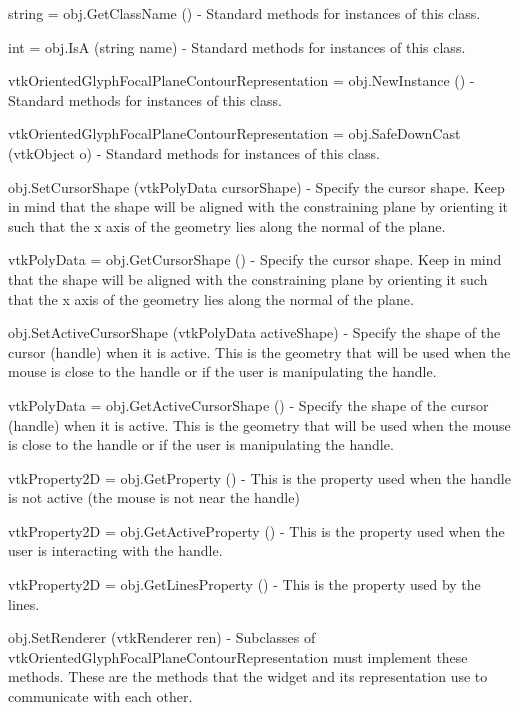 \begin{DoxyItemize}
\item {\ttfamily string = obj.\-Get\-Class\-Name ()} -\/ Standard methods for instances of this class.  
\item {\ttfamily int = obj.\-Is\-A (string name)} -\/ Standard methods for instances of this class.  
\item {\ttfamily vtk\-Oriented\-Glyph\-Focal\-Plane\-Contour\-Representation = obj.\-New\-Instance ()} -\/ Standard methods for instances of this class.  
\item {\ttfamily vtk\-Oriented\-Glyph\-Focal\-Plane\-Contour\-Representation = obj.\-Safe\-Down\-Cast (vtk\-Object o)} -\/ Standard methods for instances of this class.  
\item {\ttfamily obj.\-Set\-Cursor\-Shape (vtk\-Poly\-Data cursor\-Shape)} -\/ Specify the cursor shape. Keep in mind that the shape will be aligned with the constraining plane by orienting it such that the x axis of the geometry lies along the normal of the plane.  
\item {\ttfamily vtk\-Poly\-Data = obj.\-Get\-Cursor\-Shape ()} -\/ Specify the cursor shape. Keep in mind that the shape will be aligned with the constraining plane by orienting it such that the x axis of the geometry lies along the normal of the plane.  
\item {\ttfamily obj.\-Set\-Active\-Cursor\-Shape (vtk\-Poly\-Data active\-Shape)} -\/ Specify the shape of the cursor (handle) when it is active. This is the geometry that will be used when the mouse is close to the handle or if the user is manipulating the handle.  
\item {\ttfamily vtk\-Poly\-Data = obj.\-Get\-Active\-Cursor\-Shape ()} -\/ Specify the shape of the cursor (handle) when it is active. This is the geometry that will be used when the mouse is close to the handle or if the user is manipulating the handle.  
\item {\ttfamily vtk\-Property2\-D = obj.\-Get\-Property ()} -\/ This is the property used when the handle is not active (the mouse is not near the handle)  
\item {\ttfamily vtk\-Property2\-D = obj.\-Get\-Active\-Property ()} -\/ This is the property used when the user is interacting with the handle.  
\item {\ttfamily vtk\-Property2\-D = obj.\-Get\-Lines\-Property ()} -\/ This is the property used by the lines.  
\item {\ttfamily obj.\-Set\-Renderer (vtk\-Renderer ren)} -\/ Subclasses of vtk\-Oriented\-Glyph\-Focal\-Plane\-Contour\-Representation must implement these methods. These are the methods that the widget and its representation use to communicate with each other.  

\end{DoxyItemize}
